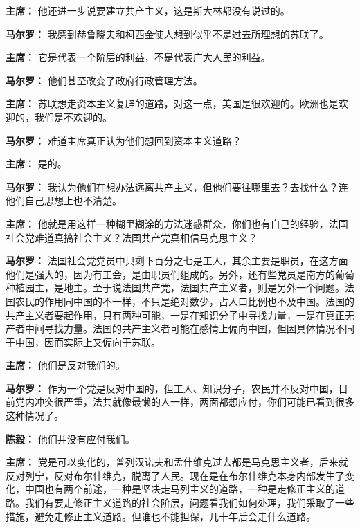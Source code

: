 \begin{duihua}
\item[\textbf{主席：}] 他还进一步说要建立共产主义，这是斯大林都没有说过的。

\item[\textbf{马尔罗：}] 我感到赫鲁晓夫和柯西金使人想到似乎不是过去所理想的苏联了。

\item[\textbf{主席：}] 它是代表一个阶层的利益，不是代表广大人民的利益。

\item[\textbf{马尔罗：}] 他们甚至改变了政府行政管理方法。

\item[\textbf{主席：}] 苏联想走资本主义复辟的道路，对这一点，美国是很欢迎的。欧洲也是欢迎的，我们是不欢迎的。

\item[\textbf{马尔罗：}] 难道主席真正认为他们想回到资本主义道路？

\item[\textbf{主席：}] 是的。

\item[\textbf{马尔罗：}] 我认为他们在想办法远离共产主义，但他们要往哪里去？去找什么？连他们自己思想上也不清楚。

\item[\textbf{主席：}] 他就是用这样一种糊里糊涂的方法迷惑群众，你们也有自己的经验，法国社会党难道真搞社会主义？法国共产党真相信马克思主义？

\item[\textbf{马尔罗：}] 法国社会党党员中只剩下百分之七是工人，其余主要是职员，在这方面他们是强大的，因为有工会，是由职员们组成的。另外，还有些党员是南方的葡萄种植园主，是地主。至于说法国共产党，法国共产主义者，则是另外一个问题。法国农民的作用同中国的不一样，不只是绝对数少，占人口比例也不及中国。法国的共产主义者要起作用，只有两种可能，一是在知识分子中寻找力量，一是在真正无产者中间寻找力量。法国的共产主义者可能在感情上偏向中国，但因具体情况不同于中国，因而实际上又偏向于苏联。

\item[\textbf{主席：}] 他们是反对我们的。

\item[\textbf{马尔罗：}] 作为一个党是反对中国的，但工人、知识分子，农民并不反对中国，目前党内冲突很严重，法共就像最懒的人一样，两面都想应付，你们可能已看到很多这种情况了。

\item[\textbf{陈毅：}] 他们并没有应付我们。

\item[\textbf{主席：}] 党是可以变化的，普列汉诺夫和孟什维克过去都是马克思主义者，后来就反对列宁，反对布尔什维克，脱离了人民。现在是在布尔什维克本身内部发生了变化，中国也有两个前途，一种是坚决走马列主义的道路，一种是走修正主义的道路。我们有要走修正主义道路的社会阶层，问题看我们如何处理，我们采取了一些措施，避免走修正主义道路。但谁也不能担保，几十年后会走什么道路。


\end{duihua}
